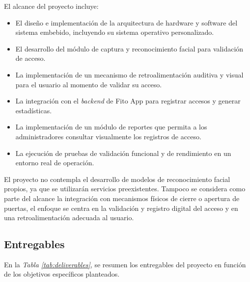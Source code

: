 El alcance del proyecto incluye:
\begin{itemize}
    \item El diseño e implementación de la arquitectura de hardware y software del sistema embebido, incluyendo su sistema operativo personalizado.
    \item El desarrollo del módulo de captura y reconocimiento facial para validación de acceso.
    \item La implementación de un mecanismo de retroalimentación auditiva y visual para el usuario al momento de validar su acceso.
    \item La integración con el \textit{backend} de Fito App para registrar accesos y generar estadísticas.
    \item La implementación de un módulo de reportes que permita a los administradores consultar visualmente los registros de acceso.
    \item La ejecución de pruebas de validación funcional y de rendimiento en un entorno real de operación.
\end{itemize}

El proyecto no contempla el desarrollo de modelos de reconocimiento facial propios, ya que se utilizarán servicios preexistentes. Tampoco se considera como parte del alcance la integración con mecanismos físicos de cierre o apertura de puertas, el enfoque se centra en la validación y registro digital del acceso y en una retroalimentación adecuada al usuario.

\subsection{Entregables}
En la \textit{Tabla \ref{tab:deliverables}}, se resumen los entregables del proyecto en función de los objetivos específicos planteados.

